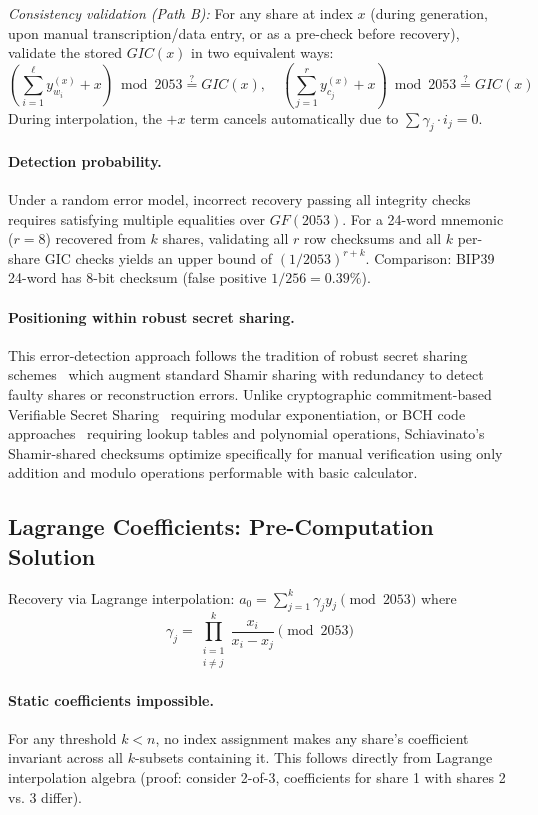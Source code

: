 \documentclass[11pt]{article}
\begin{document}
\textit{Consistency validation (Path B):} For any share at index $x$ (during generation, upon manual transcription/data entry, or as a pre-check before recovery), validate the stored $GIC(x)$ in two equivalent ways:
\[
\left(\sum_{i=1}^{\ell} y_{w_i}^{(x)} + x\right) \bmod 2053 \stackrel{?}{=} GIC(x), \quad
\left(\sum_{j=1}^{r} y_{c_j}^{(x)} + x\right) \bmod 2053 \stackrel{?}{=} GIC(x)
\]
During interpolation, the $+x$ term cancels automatically due to $\sum \gamma_j \cdot i_j = 0$.

\paragraph{Detection probability.} Under a random error model, incorrect recovery passing all integrity checks requires satisfying multiple equalities over $GF(2053)$. For a 24-word mnemonic ($r=8$) recovered from $k$ shares, validating all $r$ row checksums and all $k$ per-share GIC checks yields an upper bound of $(1/2053)^{r+k}$. Comparison: BIP39 24-word has 8-bit checksum (false positive $1/256 = 0.39\%$).

\paragraph{Positioning within robust secret sharing.} This error-detection approach follows the tradition of robust secret sharing schemes~\cite{tompa1988,feldman1987} which augment standard Shamir sharing with redundancy to detect faulty shares or reconstruction errors. Unlike cryptographic commitment-based Verifiable Secret Sharing~\cite{feldman1987} requiring modular exponentiation, or BCH code approaches~\cite{codex32} requiring lookup tables and polynomial operations, Schiavinato's Shamir-shared checksums optimize specifically for manual verification using only addition and modulo operations performable with basic calculator.

\subsection{Lagrange Coefficients: Pre-Computation Solution}
\label{sec:lagrange}

Recovery via Lagrange interpolation: $a_0 = \sum_{j=1}^k \gamma_j y_j \pmod{2053}$ where
\[
\gamma_j = \prod_{\substack{i=1 \\ i \neq j}}^k \frac{x_i}{x_i - x_j} \pmod{2053}
\]

\paragraph{Static coefficients impossible.} For any threshold $k < n$, no index assignment makes any share's coefficient invariant across all $k$-subsets containing it. This follows directly from Lagrange interpolation algebra (proof: consider 2-of-3, coefficients for share 1 with shares 2 vs. 3 differ).
\end{document}
